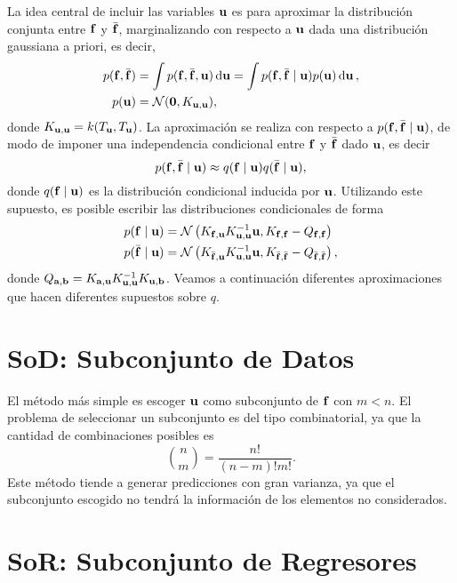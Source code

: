 La idea central de incluir las variables \(\mathbf{u}\) es para aproximar la distribución conjunta entre \(\mathbf{f}\) y \(\bar{\mathbf{f}}\), marginalizando con respecto a \(\mathbf{u}\) dada una distribución gaussiana a priori, es decir,
\begin{align*}
	p(\mathbf{f}, \bar{\mathbf{f}})	&= \int p(\mathbf{f}, \bar{\mathbf{f}}, \mathbf{u}) \dd{\mathbf{u}} = \int p(\mathbf{f}, \bar{\mathbf{f}} \mid \mathbf{u}) p(\mathbf{u}) \dd{\mathbf{u}}, \\
	p(\mathbf{u})				&= \mathcal{N}(\mathbf{0}, K_{\mathbf{u}, \mathbf{u}}),
\end{align*}
donde \(K_{\mathbf{u}, \mathbf{u}} = k(T_{\mathbf{u}}, T_{\mathbf{u}})\). La aproximación se realiza con respecto a \(p(\mathbf{f}, \bar{\mathbf{f}} \mid \mathbf{u})\), de modo de imponer una independencia condicional entre \(\mathbf{f}\) y \(\bar{\mathbf{f}}\) dado \(\mathbf{u}\), es decir
\begin{equation*}
p(\mathbf{f}, \bar{\mathbf{f}} \mid \mathbf{u}) \approx q(\mathbf{f} \mid \mathbf{u}) q(\bar{\mathbf{f}} \mid \mathbf{u}),
\end{equation*}
donde \(q(\mathbf{f} \mid \mathbf{u})\) es la distribución condicional inducida por \(\mathbf{u}\). Utilizando este supuesto, es posible escribir las distribuciones condicionales de forma
\begin{align*}
	p(\mathbf{f} \mid \mathbf{u})		&= \mathcal{N}\left(K_{\mathbf{f}, \mathbf{u}} K_{\mathbf{u},\mathbf{u}}^{-1} \mathbf{u}, K_{\mathbf{f}, \mathbf{f}}-Q_{\mathbf{f}, \mathbf{f}}\right) \\
	p(\bar{\mathbf{f}} \mid \mathbf{u})	&= \mathcal{N}\left(K_{\bar{\mathbf{f}}, \mathbf{u}} K_{\mathbf{u}, \mathbf{u}}^{-1} \mathbf{u}, K_{\bar{\mathbf{f}}, \bar{\mathbf{f}}} - Q_{\bar{\mathbf{f}}, \bar{\mathbf{f}}}\right),
\end{align*}
donde \(Q_{\mathbf{a}, \mathbf{b}} = K_{\mathbf{a}, \mathbf{u}} K_{\mathbf{u}, \mathbf{u}}^{-1} K_{\mathbf{u}, \mathbf{b}}\). Veamos a continuación diferentes aproximaciones que hacen diferentes supuestos sobre \(q\).

\section{SoD: Subconjunto de Datos}

El método más simple es escoger \(\mathbf{u}\) como subconjunto de \(\mathbf{f}\) con \(m < n\). El problema de seleccionar un subconjunto es del tipo combinatorial, ya que la cantidad de combinaciones posibles es
\[ \binom{n}{m} = \frac{n!}{(n-m)! m!}.\]
Este método tiende a generar predicciones con gran varianza, ya que el subconjunto escogido no tendrá la información de los elementos no considerados.

\section{SoR: Subconjunto de Regresores}

